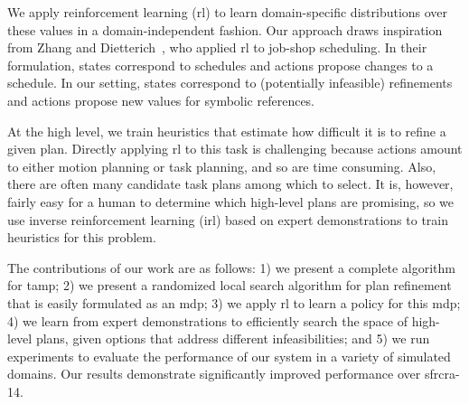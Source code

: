 We apply reinforcement learning ({\sc rl}) to learn domain-specific
distributions over these values in a domain-independent fashion.  Our
approach draws inspiration from Zhang and
Dietterich~\cite{JobShopSched}, who applied {\sc rl} to job-shop
scheduling. In their formulation, states correspond to schedules and
actions propose changes to a schedule. In our setting, states
correspond to (potentially infeasible) refinements and actions propose
new values for symbolic references.


At the high level, we train heuristics that estimate how difficult it
is to refine a given plan. Directly applying {\sc rl} to
this task is challenging because actions amount to either motion
planning or task planning, and so are time consuming. Also, there are often
many candidate task plans among which to select. It is,
however, fairly easy for a human to determine which high-level plans
are promising, so we use inverse reinforcement learning ({\sc irl}) based on
expert demonstrations to train heuristics for this problem.


The contributions of our work are as follows: 1) we present a complete
algorithm for {\sc tamp}; 2) we present a randomized local search
algorithm for plan refinement that is easily formulated as an {\sc
  mdp}; 3) we apply {\sc rl} to learn a policy for this {\sc mdp}; 4)
we learn from expert demonstrations to efficiently search the space of
high-level plans, given options that address different
infeasibilities; and 5) we run experiments to evaluate the performance
of our system in a variety of simulated domains. Our results
demonstrate significantly improved performance over {\sc sfrcra-14}.
